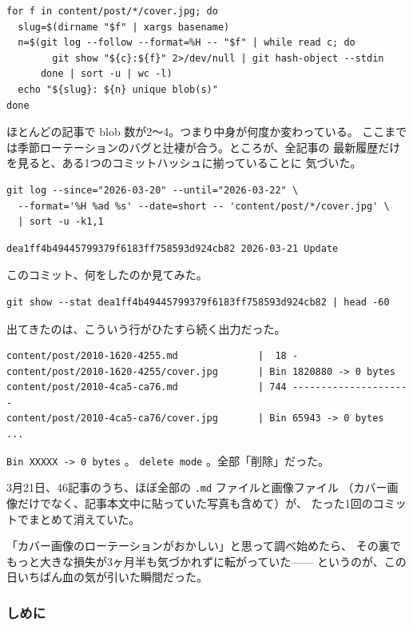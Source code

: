 \documentclass[11pt]{article}
\begin{document}
\begin{verbatim}
for f in content/post/*/cover.jpg; do
  slug=$(dirname "$f" | xargs basename)
  n=$(git log --follow --format=%H -- "$f" | while read c; do
        git show "${c}:${f}" 2>/dev/null | git hash-object --stdin
      done | sort -u | wc -l)
  echo "${slug}: ${n} unique blob(s)"
done
\end{verbatim}

ほとんどの記事で blob 数が2〜4。つまり中身が何度か変わっている。
ここまでは季節ローテーションのバグと辻褄が合う。ところが、全記事の
最新履歴だけを見ると、ある1つのコミットハッシュに揃っていることに
気づいた。

\begin{verbatim}
git log --since="2026-03-20" --until="2026-03-22" \
  --format='%H %ad %s' --date=short -- 'content/post/*/cover.jpg' \
  | sort -u -k1,1
\end{verbatim}

\begin{verbatim}
dea1ff4b49445799379f6183ff758593d924cb82 2026-03-21 Update
\end{verbatim}

このコミット、何をしたのか見てみた。

\begin{verbatim}
git show --stat dea1ff4b49445799379f6183ff758593d924cb82 | head -60
\end{verbatim}

出てきたのは、こういう行がひたすら続く出力だった。

\begin{verbatim}
content/post/2010-1620-4255.md              |  18 -
content/post/2010-1620-4255/cover.jpg       | Bin 1820880 -> 0 bytes
content/post/2010-4ca5-ca76.md              | 744 ---------------------
content/post/2010-4ca5-ca76/cover.jpg       | Bin 65943 -> 0 bytes
...
\end{verbatim}

\texttt{Bin XXXXX -> 0 bytes} 。 \texttt{delete mode} 。全部「削除」だった。

3月21日、46記事のうち、ほぼ全部の \texttt{.md} ファイルと画像ファイル
（カバー画像だけでなく、記事本文中に貼っていた写真も含めて）が、
たった1回のコミットでまとめて消えていた。

「カバー画像のローテーションがおかしい」と思って調べ始めたら、
その裏でもっと大きな損失が3ヶ月半も気づかれずに転がっていた——
というのが、この日いちばん血の気が引いた瞬間だった。
\subsubsection{しめに}
\label{sec:org98d156a}
\end{document}
